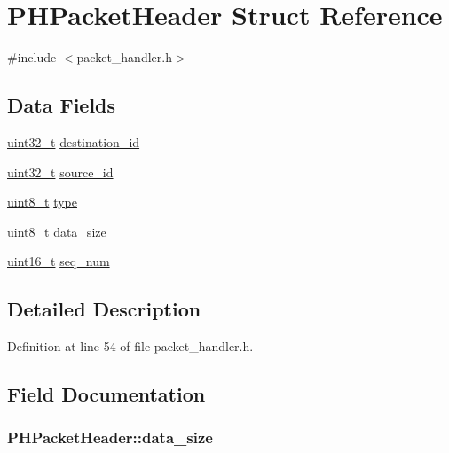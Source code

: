 \hypertarget{struct_p_h_packet_header}{\section{P\-H\-Packet\-Header Struct Reference}
\label{struct_p_h_packet_header}
}


{\ttfamily \#include $<$packet\-\_\-handler.\-h$>$}

\subsection*{Data Fields}
\begin{DoxyCompactItemize}
\item 
\hyperlink{stdint_8h_a435d1572bf3f880d55459d9805097f62}{uint32\-\_\-t} \hyperlink{struct_p_h_packet_header_a19915477b7c7c9c24b293ba4db7c6426}{destination\-\_\-id}
\item 
\hyperlink{stdint_8h_a435d1572bf3f880d55459d9805097f62}{uint32\-\_\-t} \hyperlink{struct_p_h_packet_header_a93bf1fc396b4d98f870fee75682423b7}{source\-\_\-id}
\item 
\hyperlink{stdint_8h_aba7bc1797add20fe3efdf37ced1182c5}{uint8\-\_\-t} \hyperlink{struct_p_h_packet_header_ad816b782c8c40b9e03bdf092fd37bb3c}{type}
\item 
\hyperlink{stdint_8h_aba7bc1797add20fe3efdf37ced1182c5}{uint8\-\_\-t} \hyperlink{struct_p_h_packet_header_ab8dbaddf1009694724c1f40b82bcb314}{data\-\_\-size}
\item 
\hyperlink{stdint_8h_a273cf69d639a59973b6019625df33e30}{uint16\-\_\-t} \hyperlink{struct_p_h_packet_header_a3d0a8a439dadc33b716f7e926a9546cf}{seq\-\_\-num}
\end{DoxyCompactItemize}


\subsection{Detailed Description}


Definition at line 54 of file packet\-\_\-handler.\-h.



\subsection{Field Documentation}
\hypertarget{struct_p_h_packet_header_ab8dbaddf1009694724c1f40b82bcb314}{
\subsubsection[{data\-\_\-size}]{ P\-H\-Packet\-Header\-::data\-\_\-size}}\label{struct_p_h_packet_header_ab8dbaddf1009694724c1f40b82bcb314}


